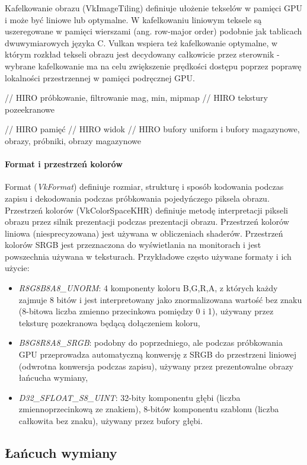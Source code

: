 Kafelkowanie obrazu (VkImageTiling) definiuje ułożenie tekselów w pamięci GPU i może być liniowe lub optymalne.
W kafelkowaniu liniowym teksele są uszeregowane w pamięci wierszami (ang. row-major order) podobnie jak tablicach dwuwymiarowych języka C.
Vulkan wspiera też kafelkowanie optymalne, w którym rozkład tekseli obrazu jest decydowany całkowicie przez sterownik - wybrane kafelkowanie ma na celu zwiększenie prędkości dostępu poprzez poprawę lokalności przestrzennej w pamięci podręcznej GPU.

// HIRO próbkowanie, filtrowanie mag, min, mipmap
// HIRO tekstury pozeekranowe

// HIRO pamięć
// HIRO widok
// HIRO bufory uniform i bufory magazynowe, obrazy, próbniki, obrazy magazynowe

\paragraph{Format i przestrzeń kolorów}
Format (\textit{VkFormat}) definiuje rozmiar, strukturę i sposób kodowania podczas zapisu i dekodowania podczas próbkowania pojedyńczego piksela obrazu.
Przestrzeń kolorów (VkColorSpaceKHR) definiuje metodę interpretacji pikseli obrazu przez silnik prezentacji podczas prezentacji obrazu.
Przestrzeń kolorów liniowa (niesprecyzowana) jest używana w obliczeniach shaderów.
Przestrzeń kolorów SRGB jest przeznaczona do wyświetlania na monitorach i jest powszechnia używana w teksturach.
Przykładowe często używane formaty i ich użycie:
\begin{itemize}
	\item \textit{R8G8B8A8\_UNORM}: 4 komponenty koloru B,G,R,A, z których każdy zajmuje 8 bitów i jest interpretowany jako znormalizowana wartość bez znaku (8-bitowa liczba zmienno przecinkowa pomiędzy 0 i 1), używany przez teksturę pozekranowa będącą dołączeniem koloru,
	\item \textit{B8G8R8A8\_SRGB}: podobny do poprzedniego, ale podczas próbkowania GPU przeprowadza automatyczną konwersję z SRGB do przestrzeni liniowej (odwrotna konwersja podczas zapisu), używany przez prezentowalne obrazy łańcucha wymiany,
	\item \textit{D32\_SFLOAT\_S8\_UINT}: 32-bity komponentu głębi (liczba zmiennoprzecinkową ze znakiem), 8-bitów komponentu szablonu (liczba całkowita bez znaku), używany przez bufory głębi.
\end{itemize}


\subsection{Łańcuch wymiany}

